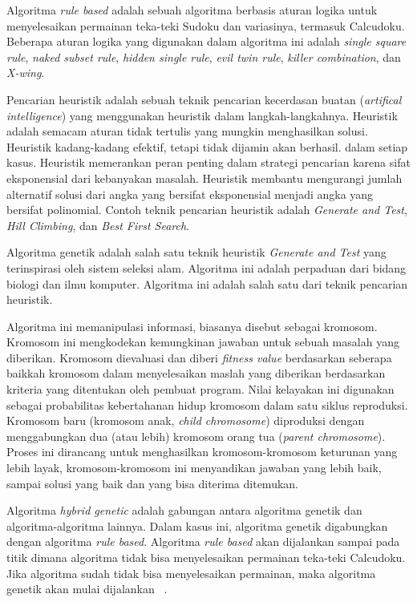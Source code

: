 Algoritma \textit{rule based} adalah sebuah algoritma berbasis aturan logika untuk menyelesaikan permainan teka-teki Sudoku dan variasinya, termasuk Calcudoku. Beberapa aturan logika yang digunakan dalam algoritma ini adalah \textit{single square rule}, \textit{naked subset rule}, \textit{hidden single rule}, \textit{evil twin rule}, \textit{killer combination}, dan \textit{X-wing}.

Pencarian heuristik adalah sebuah teknik pencarian kecerdasan buatan (\textit{artifical intelligence}) yang menggunakan heuristik dalam langkah-langkahnya. Heuristik adalah semacam aturan tidak tertulis yang mungkin menghasilkan solusi. Heuristik kadang-kadang efektif, tetapi tidak dijamin akan berhasil. dalam setiap kasus. Heuristik memerankan peran penting dalam strategi pencarian karena sifat eksponensial dari kebanyakan masalah. Heuristik membantu mengurangi jumlah alternatif solusi dari angka yang bersifat eksponensial menjadi angka yang bersifat polinomial. Contoh teknik pencarian heuristik adalah \textit{Generate and Test}, \textit{Hill Climbing}, dan \textit{Best First Search}.

Algoritma genetik adalah salah satu teknik heuristik \textit{Generate and Test} yang terinspirasi oleh sistem seleksi alam. Algoritma ini adalah perpaduan dari bidang biologi dan ilmu komputer. Algoritma ini adalah salah satu dari teknik pencarian heuristik.

Algoritma ini memanipulasi informasi, biasanya disebut sebagai kromosom. Kromosom ini mengkodekan kemungkinan jawaban untuk sebuah masalah yang diberikan. Kromosom dievaluasi dan diberi \textit{fitness value} berdasarkan seberapa baikkah kromosom dalam menyelesaikan maslah yang diberikan berdasarkan kriteria yang ditentukan oleh pembuat program. Nilai kelayakan ini digunakan sebagai probabilitas kebertahanan hidup kromosom dalam satu siklus reproduksi. Kromosom baru (kromosom anak, \textit{child chromosome}) diproduksi dengan menggabungkan dua (atau lebih) kromosom orang tua (\textit{parent chromosome}). Proses ini dirancang untuk menghasilkan kromosom-kromosom keturunan yang lebih layak, kromosom-kromosom ini menyandikan jawaban yang lebih baik, sampai solusi yang baik dan yang bisa diterima ditemukan.

Algoritma \textit{hybrid genetic} adalah gabungan antara algoritma genetik dan algoritma-algoritma lainnya. Dalam kasus ini, algoritma genetik digabungkan dengan algoritma \textit{rule based}. Algoritma \textit{rule based} akan dijalankan sampai pada titik dimana algoritma tidak bisa menyelesaikan permainan teka-teki Calcudoku. Jika algoritma sudah tidak bisa menyelesaikan permainan, maka algoritma genetik akan mulai dijalankan ~\cite{johanna:12:hybrid}.

